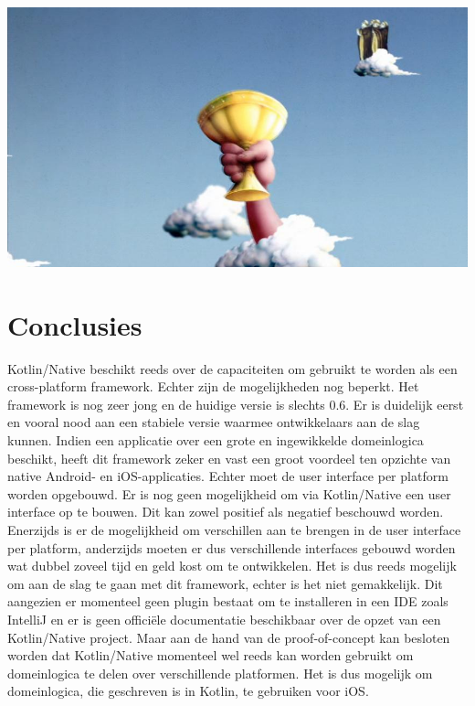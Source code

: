 \documentclass[a0,portrait]{a0poster}
\begin{document}
\begin{multicols}{2}
\begin{center}\vspace{1cm}
\includegraphics[width=1.0\linewidth]{grail}
\end{center}\vspace{1cm}
\fi




\color{HoGentAccent1} 
\section*{Conclusies}
\color{black}
Kotlin/Native beschikt reeds over de capaciteiten om gebruikt te worden als een cross-platform framework. Echter zijn de mogelijkheden nog beperkt. Het framework is nog zeer jong en de huidige versie is slechts 0.6. Er is duidelijk eerst en vooral nood aan een stabiele versie waarmee ontwikkelaars aan de slag kunnen. Indien een applicatie over een grote en ingewikkelde domeinlogica beschikt, heeft dit framework zeker en vast een groot voordeel ten opzichte van native Android- en iOS-applicaties. Echter moet de user interface per platform worden opgebouwd. Er is nog geen mogelijkheid om via Kotlin/Native een user interface op te bouwen. Dit kan zowel positief als negatief beschouwd worden. Enerzijds is er de mogelijkheid om verschillen aan te brengen in de user interface per platform, anderzijds moeten er dus verschillende interfaces gebouwd worden wat dubbel zoveel tijd en geld kost om te ontwikkelen. Het is dus reeds mogelijk om aan de slag te gaan met dit framework, echter is het niet gemakkelijk. Dit aangezien er momenteel geen plugin bestaat om te installeren in een IDE zoals IntelliJ en er is geen officiële documentatie beschikbaar over de opzet van een Kotlin/Native project. Maar aan de hand van de proof-of-concept kan besloten worden dat Kotlin/Native momenteel wel reeds kan worden gebruikt om domeinlogica te delen over verschillende platformen. Het is dus mogelijk om domeinlogica, die geschreven is in Kotlin, te gebruiken voor iOS.
\color{HoGentAccent1} 

\end{multicols}
\end{document}
